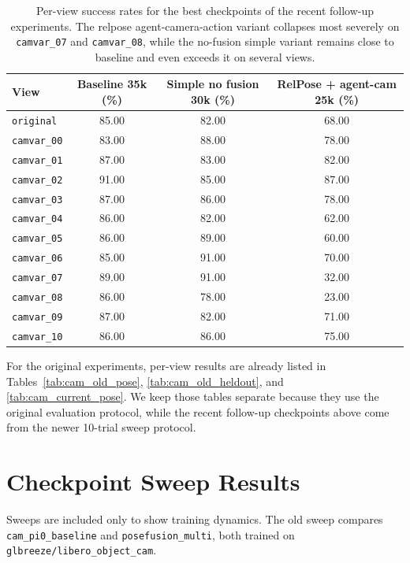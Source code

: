 \documentclass[11pt]{article}
\begin{document}
\begin{table}[p]
\centering
\small
\begin{tabular}{lccc}
\toprule
\textbf{View} & \textbf{Baseline 35k (\%)} & \textbf{Simple no fusion 30k (\%)} & \textbf{RelPose + agent-cam 25k (\%)} \\
\midrule
\texttt{original} & 85.00 & 82.00 & 68.00 \\
\texttt{camvar\_00} & 83.00 & 88.00 & 78.00 \\
\texttt{camvar\_01} & 87.00 & 83.00 & 82.00 \\
\texttt{camvar\_02} & 91.00 & 85.00 & 87.00 \\
\texttt{camvar\_03} & 87.00 & 86.00 & 78.00 \\
\texttt{camvar\_04} & 86.00 & 82.00 & 62.00 \\
\texttt{camvar\_05} & 86.00 & 89.00 & 60.00 \\
\texttt{camvar\_06} & 85.00 & 91.00 & 70.00 \\
\texttt{camvar\_07} & 89.00 & 91.00 & 32.00 \\
\texttt{camvar\_08} & 86.00 & 78.00 & 23.00 \\
\texttt{camvar\_09} & 87.00 & 82.00 & 71.00 \\
\texttt{camvar\_10} & 86.00 & 86.00 & 75.00 \\
\bottomrule
\end{tabular}
\caption{Per-view success rates for the best checkpoints of the recent follow-up experiments. The relpose agent-camera-action variant collapses most severely on \texttt{camvar\_07} and \texttt{camvar\_08}, while the no-fusion simple variant remains close to baseline and even exceeds it on several views.}
\label{tab:cam_followup_per_view}
\end{table}

For the original experiments, per-view results are already listed in Tables~\ref{tab:cam_old_pose}, \ref{tab:cam_old_heldout}, and \ref{tab:cam_current_pose}. We keep those tables separate because they use the original evaluation protocol, while the recent follow-up checkpoints above come from the newer 10-trial sweep protocol.

\section{Checkpoint Sweep Results}
Sweeps are included only to show training dynamics. The old sweep compares \texttt{cam\_pi0\_baseline} and \texttt{posefusion\_multi}, both trained on \texttt{glbreeze/libero\_object\_cam}.
\end{document}
